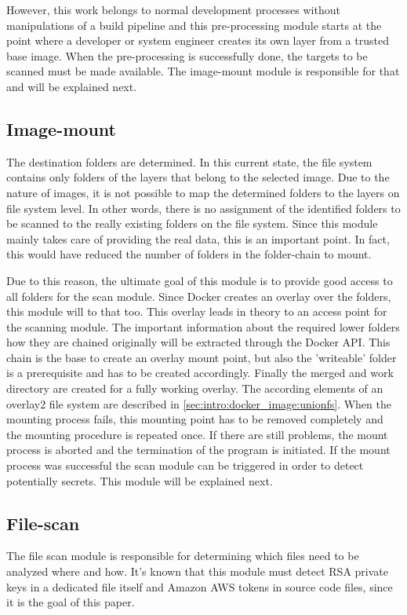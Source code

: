 However, this work belongs to normal development processes without manipulations of a build pipeline and this pre-processing module starts at the point where a developer or system engineer creates its own layer from a trusted base image. When the pre-processing is successfully done, the targets to be scanned must be made available. The image-mount module is responsible for that and will be explained next.

\subsection{Image-mount}
\label{ch:theory:analysing_process:imgmount}
The destination folders are determined. In this current state, the file system contains only folders of the layers that belong to the selected image.
Due to the nature of images, it is not possible to map the determined folders to the layers on file system level. In other words, there is no assignment of the identified folders to be scanned to the really existing folders on the file system.
Since this module mainly takes care of providing the real data, this is an important point. In fact, this would have reduced the number of folders in the folder-chain to mount. 

Due to this reason, the ultimate goal of this module is to provide good access to all folders for the scan module. Since Docker creates an overlay over the folders, this module will to that too. This overlay leads in theory to an access point for the scanning module. The important information about the required lower folders how they are chained originally will be extracted through the Docker API. This chain is the base to create an overlay mount point, but also the 'writeable' folder is a prerequisite and has to be created accordingly. Finally the merged and work directory are created for a fully working overlay. The according elements of an overlay2 file system are described in \ref{sec:intro:docker_image:unionfs}. When the mounting process fails, this mounting point has to be removed completely and the mounting procedure is repeated once. If there are still problems, the mount process is aborted and the termination of the program is initiated. If the mount process was successful the scan module can be triggered in order to detect potentially secrets. This module will be explained next.

\subsection{File-scan}
\label{ch:theory:analysing_process:scan}
The file scan module is responsible for determining which files need to be analyzed where and how. It's known that this module must detect RSA private keys in a dedicated file itself and Amazon AWS tokens in source code files, since it is the goal of this paper.

